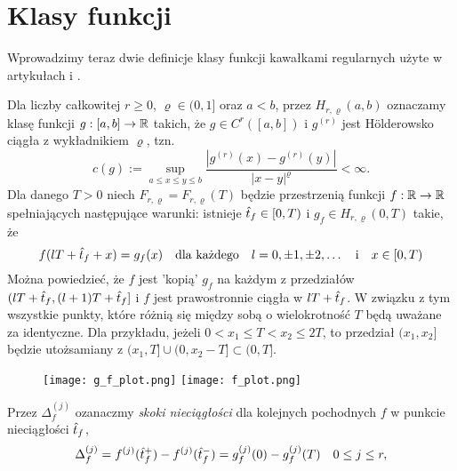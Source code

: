 \documentclass[oik, pdftex, robocza, man]{mgrwms}
\begin{document}
\section{Klasy funkcji}


    Wprowadzimy teraz dwie definicje klasy funkcji kawałkami regularnych użyte w artykułach \cite{CoDF} i \cite{AoP}. 
    
    Dla liczby całkowitej $ r \geq 0$, $\varrho \in (0,1]$ oraz $a < b$, przez $H_{r, \varrho}(a,b)$ oznaczamy klasę funkcji $g: [a,b] \rightarrow \mathbb{R}$ takich, że $g \in C^r([a, b])$ i $g^{(r)}$ jest Hölderowsko ciągła z wykładnikiem $\varrho$, tzn.
    \begin{equation*}
        c(g) := \sup_{a \leq x \leq y \leq b} \frac{|g^{(r)}(x) - g^{(r)}(y)|}{|x-y|^{\varrho}} < \infty.
    \end{equation*}
    Dla danego $T > 0$ niech $F_{r, \varrho} = F_{r, \varrho}(T)$ będzie przestrzenią funkcji $f: \mathbb{R} \rightarrow \mathbb{R}$ spełniających następujące warunki: istnieje $\hat{t}_{f} \in [0, T)$ i $g_f \in H_{r, \varrho}(0,T)$ takie, że
    \begin{equation*}
        f(lT + \hat{t}_f + x) = g_f(x) \quad \text{dla każdego} \quad l = 0, \pm 1, \pm 2, \ldots \quad \text{i} \quad x \in [0, T)
    \end{equation*}
    Można powiedzieć, że $f$ jest 'kopią' $g_f$ na każdym z przedziałów $(lT + \hat{t}_f, (l + 1)T + \hat{t}_f]$ i $f$ jest prawostronnie ciągła w $lT + \hat{t}_f$. W związku z tym wszystkie punkty, które różnią się między sobą o wielokrotność $T$ będą uważane za identyczne. Dla przykładu, jeżeli $0 < x_1 \leq T < x_2 \leq 2T$, to przedział $(x_1, x_2]$ będzie utożsamiany z $(x_1,T] \cup (0, x_2 - T] \subset (0, T]$.

    \begin{figure}[h!]
        \texttt{[image: g\_f\_plot.png]}
        \texttt{[image: f\_plot.png]}
    \end{figure}


    Przez $\Delta_f^{(j)}$ ozanaczmy \emph{skoki nieciągłości} dla kolejnych pochodnych $f$ w punkcie nieciągłości $\hat{t}_f$,
    \begin{equation*}
        \Delta_f^{(j)} = f^{(j)}(\hat{t}_f^+) - f^{(j)}(\hat{t}_f^-) = g_f^{(j)}(0) - g_f^{(j)}(T) \quad 0 \leq j \leq r,
    \end{equation*}
\end{document}
